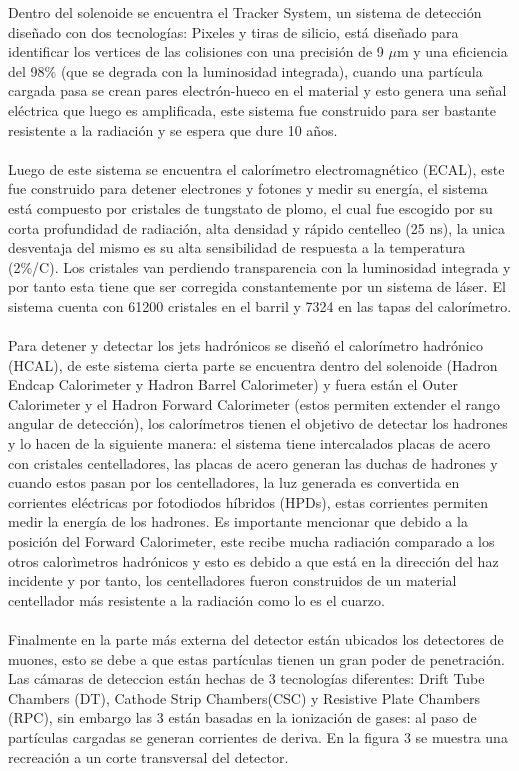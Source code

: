 Dentro del solenoide se encuentra el Tracker System, un sistema de detección diseñado con dos tecnologías: Pixeles y tiras de silicio, está diseñado para identificar los vertices de las colisiones con una precisión de 9 $\mu$m y una eficiencia del 98\% (que se degrada con la luminosidad integrada), cuando una partícula cargada pasa se crean pares electrón-hueco en el material y esto genera una señal eléctrica que luego es amplificada, este sistema fue construido para ser bastante resistente a la radiación y se espera que dure 10 años.
\\
\\
Luego de este sistema se encuentra el calorímetro electromagnético (ECAL), este fue construido para detener electrones y fotones y medir su energía, el sistema está compuesto por cristales de tungstato de plomo, el cual fue escogido por su corta profundidad de radiación, alta densidad y rápido centelleo (25 ns), la unica desventaja del mismo es su alta sensibilidad de respuesta a la temperatura (2\%/C). Los cristales van perdiendo transparencia con la luminosidad integrada y por tanto esta tiene que ser corregida constantemente por un sistema de láser. El sistema cuenta con 61200 cristales en el barril y 7324 en las tapas del calorímetro.
\\
\\
Para detener y detectar los jets hadrónicos se diseñó el calorímetro hadrónico (HCAL), de este sistema cierta parte se encuentra dentro del solenoide (Hadron Endcap Calorimeter y Hadron Barrel Calorimeter) y fuera están el Outer Calorimeter y el Hadron Forward Calorimeter (estos permiten extender el rango angular de detección), los calorímetros tienen el objetivo de detectar los hadrones y lo hacen de la siguiente manera: el sistema tiene intercalados placas de acero con cristales centelladores, las placas de acero generan las duchas de hadrones y cuando estos pasan por los centelladores, la luz generada es convertida en corrientes eléctricas por fotodiodos híbridos (HPDs), estas corrientes permiten medir la energía de los hadrones. Es importante mencionar que debido a la posición del Forward Calorimeter, este recibe mucha radiación comparado a los otros calorìmetros hadrónicos y esto es debido a que está en la dirección del haz incidente y por tanto, los centelladores fueron construidos de un material centellador más resistente a la radiación como lo es el cuarzo.
\\
\\
Finalmente en la parte más externa del detector están ubicados los detectores de muones, esto se debe a que estas partículas tienen un gran poder de penetración. Las cámaras de deteccion están hechas de 3 tecnologías diferentes: Drift Tube Chambers (DT), Cathode Strip Chambers(CSC) y Resistive Plate Chambers (RPC), sin embargo las 3 están basadas en la ionización de gases: al paso de partículas cargadas se generan corrientes de deriva. En la figura 3 se muestra una recreación a un corte transversal del detector.

